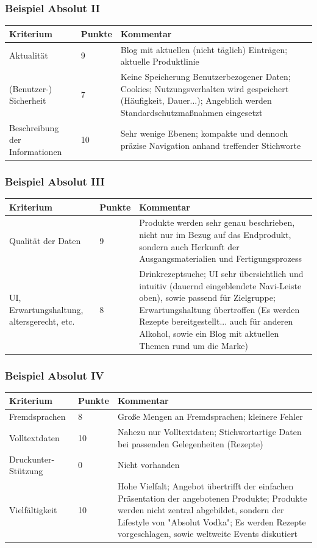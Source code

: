 \begin{frame}\frametitle{Beispiel Absolut II}
	\begin{tabular}{|p{}|l|p{6cm}|}
	\hline
	  Kriterium & Punkte & Kommentar \\ \hline
  	  Aktualität & 9 & Blog mit aktuellen (nicht täglich) Einträgen; aktuelle Produktlinie \\ \hline
	  (Benutzer-) Sicherheit & 7 & Keine Speicherung Benutzerbezogener Daten; Cookies; Nutzungsverhalten wird gespeichert (Häufigkeit, Dauer...); Angeblich werden Standardschutzmaßnahmen eingesetzt \\ \hline
	  Beschreibung der Informationen & 10 & Sehr wenige Ebenen; kompakte und dennoch präzise Navigation anhand treffender Stichworte \\ \hline
 	\end{tabular}
\end{frame}

\begin{frame}\frametitle{Beispiel Absolut III}
	\begin{tabular}{|p{}|l|p{6cm}|}
	\hline
	  Kriterium & Punkte & Kommentar \\ \hline
	  Qualität der Daten & 9 & Produkte werden sehr genau beschrieben, nicht nur im Bezug auf das Endprodukt, sondern auch Herkunft der Ausgangsmaterialien und Fertigungsprozess \\ \hline
	  UI, Erwartungshaltung, altersgerecht, etc. & 8 & Drinkrezeptsuche; UI sehr übersichtlich und intuitiv (dauernd eingeblendete Navi-Leiste oben), sowie passend für Zielgruppe; Erwartungshaltung übertroffen (Es werden Rezepte bereitgestellt... auch für anderen Alkohol, sowie ein Blog mit aktuellen Themen rund um die Marke) \\ \hline
 	\end{tabular}
\end{frame}

\begin{frame}\frametitle{Beispiel Absolut IV}
	\begin{tabular}{|p{}|l|p{6cm}|}
	\hline
	  Kriterium & Punkte & Kommentar \\ \hline
	  Fremdsprachen & 8 & Große Mengen an Fremdsprachen; kleinere Fehler \\ \hline
	  Volltextdaten & 10 & Nahezu nur Volltextdaten; Stichwortartige Daten bei passenden Gelegenheiten (Rezepte) \\ \hline
	  Druckunter- Stützung & 0 & Nicht vorhanden \\ \hline
	  Vielfältigkeit & 10 & Hohe Vielfalt; Angebot übertrifft der einfachen Präsentation der angebotenen Produkte; Produkte werden nicht zentral abgebildet, sondern der Lifestyle von "Absolut Vodka"; Es werden Rezepte vorgeschlagen, sowie weltweite Events diskutiert \\ \hline
 	\end{tabular}
\end{frame}

